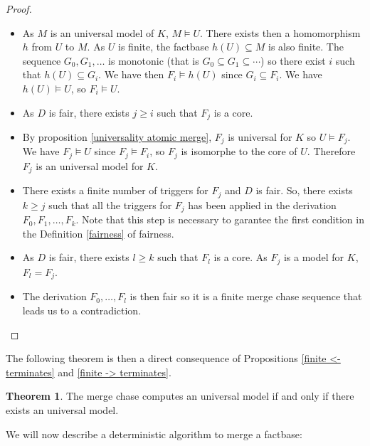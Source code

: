 \documentclass{article}
\theoremstyle{definition}
\newtheorem{theorem}{Theorem}[section]
\theoremstyle{remark}
\begin{document}
\begin{proof}
\begin{itemize}
\item As $M$ is an universal model of $K$, $M \vDash U$. There exists then a homomorphism $h$ from $U$ to $M$. As $U$ is finite, the factbase $h(U)\subseteq M$ is also finite. The sequence $G_0,G_1,\ldots$ is monotonic (that is $G_0 \subseteq G_1 \subseteq \cdots$) so there exist $i$ such that $h(U) \subseteq G_i$. We have then $F_i \vDash h(U)$ since $G_i \subseteq F_i$. We have $h(U) \vDash U$, so $F_i\vDash U$. 

\item As $D$ is fair, there exists $j \geq i$ such that $F_j$ is a core. 

\item By proposition \ref{universality atomic merge}, $F_j$ is universal for $K$ so $U \vDash F_j$. We have $F_j \vDash U$ since $F_j \vDash F_i$, so $F_j$ is isomorphe to the core of $U$. Therefore $F_j$ is an universal model for $K$.

\item There exists a finite number of triggers for $F_j$ and $D$ is fair. So, there exists $k \geq j$ such that all the triggers for $F_j$ has been applied in the derivation $F_0,F_1,\ldots,F_k$. Note that this step is necessary to garantee the first condition in the Definition \ref{fairness} of fairness.

\item As $D$ is fair, there exists $l\geq k$ such that $F_l$ is a core. As $F_j$ is a model for $K$, $F_l = F_j$.  



\item The derivation $F_0,\ldots,F_l$ is then fair so it is a finite merge chase sequence that leads us to a contradiction.
\end{itemize}
\end{proof}

The following theorem is then a direct consequence of Propositions \ref{finite <- terminates} and \ref{finite -> terminates}.

\begin{theorem}
The merge chase computes an universal model if and only if there exists an universal model.
\end{theorem}

We will now describe a deterministic algorithm to merge a factbase:
\end{document}
